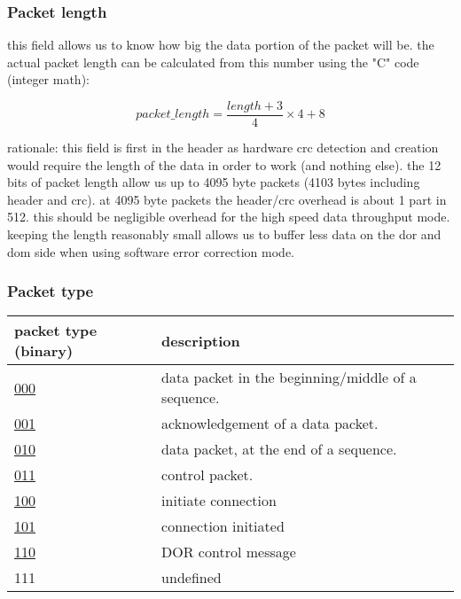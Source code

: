 \documentclass[11pt]{article}
\begin{document}
\hypertarget{packet-length}{\subsubsection{Packet length}}

  this field allows us to know how big the data portion of
  the packet will be.  the actual packet length can be calculated
  from this number using the "C" code (integer math):

\[ packet\_length = \frac{ length + 3 }{4} \times 4 + 8 \]

  rationale: this field is first in the header as hardware crc
  detection and creation would require the length of the data
  in order to work (and nothing else).  the 12 bits of packet
  length allow us up to 4095 byte packets (4103 bytes including
  header and crc).  at 4095 byte packets the header/crc overhead
  is about 1 part in 512.  this should be negligible overhead
  for the high speed data throughput mode.  keeping the length 
  reasonably small allows us to buffer less data on the dor and 
  dom side when using software error correction mode.

\hypertarget{packet-type}{\subsubsection{Packet type}}

\begin{center}
\begin{longtable}{lp{}}
   packet type (binary) & description \\ \hline
    \hyperlink{data-packet-no-syn-fin}{000} & data packet in the beginning/middle of a sequence. \\
    \hyperlink{ack-packet}{001} & acknowledgement of a data packet. \\
    \hyperlink{data-packet-syn-fin}{010} & data packet, at the end of a sequence. \\
    \hyperlink{control-packet}{011} & control packet. \\
    \hyperlink{initiate-connection}{100} & initiate connection \\
    \hyperlink{connection-initiated}{101} & connection initiated \\
    \hyperlink{dor-control-packet}{110} & DOR control message \\
    111 & undefined
\end{longtable}
\end{center}
\end{document}
